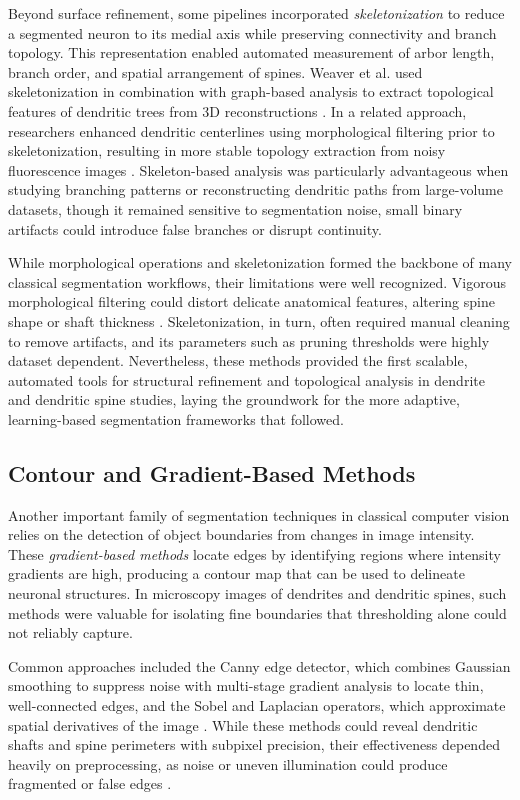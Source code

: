 Beyond surface refinement, some pipelines incorporated \textit{skeletonization} to reduce a segmented neuron to its medial axis while preserving connectivity and branch topology. This representation enabled automated measurement of arbor length, branch order, and spatial arrangement of spines. Weaver et al. used skeletonization in combination with graph-based analysis to extract topological features of dendritic trees from 3D reconstructions \cite{Weaver_2004}. In a related approach, researchers enhanced dendritic centerlines using morphological filtering prior to skeletonization, resulting in more stable topology extraction from noisy fluorescence images \cite{Zhang_2016}. Skeleton-based analysis was particularly advantageous when studying branching patterns or reconstructing dendritic paths from large-volume datasets, though it remained sensitive to segmentation noise, small binary artifacts could introduce false branches or disrupt continuity.

While morphological operations and skeletonization formed the backbone of many classical segmentation workflows, their limitations were well recognized. Vigorous morphological filtering could distort delicate anatomical features, altering spine shape or shaft thickness \cite{Roszkowska_2016}. Skeletonization, in turn, often required manual cleaning to remove artifacts, and its parameters such as pruning thresholds were highly dataset dependent. Nevertheless, these methods provided the first scalable, automated tools for structural refinement and topological analysis in dendrite and dendritic spine studies, laying the groundwork for the more adaptive, learning-based segmentation frameworks that followed.

\subsection{Contour and Gradient-Based Methods}
Another important family of segmentation techniques in classical computer vision relies on the detection of object boundaries from changes in image intensity. These \textit{gradient-based methods} locate edges by identifying regions where intensity gradients are high, producing a contour map that can be used to delineate neuronal structures. In microscopy images of dendrites and dendritic spines, such methods were valuable for isolating fine boundaries that thresholding alone could not reliably capture.

Common approaches included the Canny edge detector, which combines Gaussian smoothing to suppress noise with multi-stage gradient analysis to locate thin, well-connected edges, and the Sobel and Laplacian operators, which approximate spatial derivatives of the image \cite{Canny_1986, Sobel_2014, Paris_2011}. While these methods could reveal dendritic shafts and spine perimeters with subpixel precision, their effectiveness depended heavily on preprocessing, as noise or uneven illumination could produce fragmented or false edges \cite{Okabe_2020, Roszkowska_2016}.

